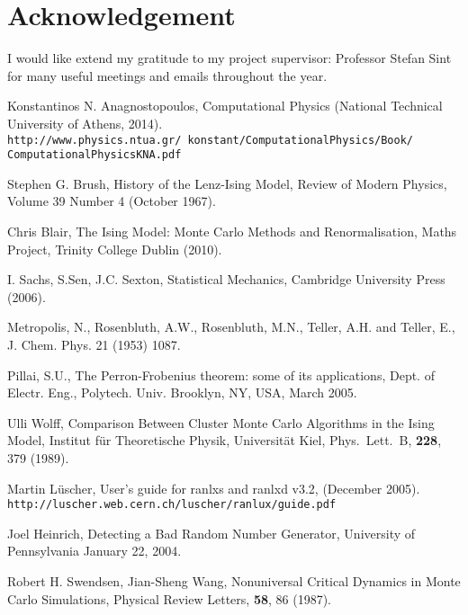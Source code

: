 \documentclass[12pt] {report} %
\begin{document}
	\section{Acknowledgement}
		I would like extend my gratitude to my project supervisor: Professor Stefan Sint for many useful meetings and emails throughout the year.	

	
	\begin{thebibliography}{}
	
		 	Konstantinos N. Anagnostopoulos, Computational Physics (National Technical University of Athens, 2014). \\ \texttt {http://www.physics.ntua.gr/~konstant/ComputationalPhysics/Book/ ComputationalPhysicsKNA.pdf}

		 Stephen G. Brush, History of the Lenz-Ising Model, Review of Modern Physics, Volume 39 Number 4 (October 
		1967).
		
		 Chris Blair, The Ising Model: Monte Carlo Methods and Renormalisation, Maths Project, Trinity College Dublin (2010).

		 I. Sachs, S.Sen, J.C. Sexton, Statistical Mechanics, Cambridge University Press (2006).
				
		 	Metropolis, N., Rosenbluth, A.W., Rosenbluth, M.N., Teller, A.H.
		and Teller, E., J. Chem. Phys. 21 (1953) 1087.
		
		 Pillai, S.U., The Perron-Frobenius theorem: some of its applications, Dept. of Electr. Eng., Polytech. Univ. Brooklyn, NY, USA, March 2005.

		 Ulli Wolff, Comparison Between Cluster Monte Carlo Algorithms in the Ising Model, Institut f\"{u}r Theoretische Physik, Universit\"{a}t Kiel, Phys.\ Lett.\ B, {\bf 228}, 379 (1989).
		
		 Martin L{\"u}scher, User's guide for ranlxs and ranlxd v3.2, (December 2005).\\ \texttt{http://luscher.web.cern.ch/luscher/ranlux/guide.pdf}
				
		 Joel Heinrich, Detecting a Bad Random Number Generator, University of Pennsylvania
		January 22, 2004.

		 Robert H. Swendsen, Jian-Sheng Wang, Nonuniversal Critical Dynamics in Monte Carlo Simulations, Physical Review Letters, {\bf 58}, 86 (1987).
		

\end{thebibliography}
\end{document}
